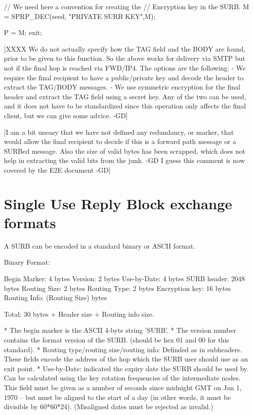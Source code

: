 		// We need here a convention for creating the
		//   Encryption key in the SURB.
		M = SPRP_DEC(seed, "PRIVATE SURB KEY",M);
		
		P = M; exit;

[XXXX We do not actually specify how the TAG field and the BODY are
found, prior to be given to this function. So the above works for
delivery via SMTP but not if the final hop is reached via FWD/IP4. The
options are the following: 
	- We require the final recipient to have a public/private key
	  and decode the header to extract the TAG/BODY messages.
	- We use symmetric encryption for the final header and extract
	  the TAG field using a secret key.
Any of the two can be used, and it does not have to be standardized
since this operation only affects the final client, but we can give
some advice. -GD]

[I am a bit uneasy that we have not defined any redundancy, or marker,
that would allow the final recipient to decide if this is a forward
path message or a SURBed message. Also the size of valid bytes has
been scrapped, which does not help in extracting the valid bits from
the junk. -GD I guess this comment is now covered by the E2E document -GD]

\section{Single Use Reply Block exchange formats}

A SURB can be encoded in a standard binary or ASCII format.

Binary Format:

   Begin Marker: 4 bytes
   Version:      2 bytes
   Use-by-Date:  4 bytes
   SURB header:  2048 bytes
   Routing Size: 2 bytes
   Routing Type: 2 bytes
   Encryption key: 16 bytes
   Routing Info: (Routing Size) bytes

   Total: 30 bytes + Header size + Routing info size.

* The begin marker is the ASCII 4-byte string 'SURB'. 
* The version number contains the format version of the SURB.
  (should be hex 01 and 00 for this standard).
* Routing type/routing size/routing info: Definded as in subheaders.  
  These fields encode the address of the hop which the SURB user should
  use as an exit point.
* Use-by-Date: indicated the expiry date the SURB should be used by. Can
  be calculated using the key rotation frequencies of the intermediate
  nodes.  This field must be given as a number of seconds since
  midnight GMT on Jan 1, 1970 -- but must be aligned to the start of a
  day (in other words, it must be divisible by 60*60*24).
  (Misaligned dates must be rejected as invalid.)

